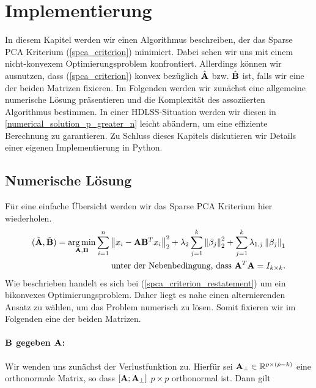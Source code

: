 \chapter{Implementierung}

\label{implementation}

In diesem Kapitel werden wir einen Algorithmus beschreiben, der das Sparse PCA Kriterium (\ref{spca_criterion}) minimiert. Dabei sehen wir uns mit einem nicht-konvexem Optimierungsproblem konfrontiert. Allerdings können wir ausnutzen, dass (\ref{spca_criterion}) konvex bezüglich $\hat{\mathbf{A}}$ bzw. $\hat{\mathbf{B}}$ ist, falls wir eine der beiden Matrizen fixieren. Im Folgenden werden wir zunächst eine allgemeine numerische Lösung präsentieren und die Komplexität des assoziierten Algorithmus bestimmen. In einer HDLSS-Situation werden wir diesen in \ref{numerical_solution_p_greater_n} leicht abändern, um eine effiziente Berechnung zu garantieren. Zu Schluss dieses Kapitels diskutieren wir Details einer eigenen Implementierung in Python.

\section{Numerische Lösung}
\label{spca_numerical_solution}

Für eine einfache Übersicht werden wir das Sparse PCA Kriterium hier wiederholen.
\begin{align}
\label{spca_criterion_restatement}
\begin{split}
(\hat{\mathbf{A}}, \hat{\mathbf{B}}) = \operatorname*{arg\,min}_{\mathbf{A}, \mathbf{B}} \sum_{i=1}^{n} \left\lVert x_i - \mathbf{A}\mathbf{B}^Tx_i \right\rVert_2^2 + \lambda_2 \sum_{j=1}^{k}\left\lVert \beta_j \right\rVert_2^2 + \sum_{j=1}^k \lambda_{1,j} \left\lVert \beta_j \right\rVert_1\\
\text{unter der Nebenbedingung, dass } \mathbf{A}^T\mathbf{A} = I_{k \times k}.
\end{split}
\end{align}
Wie beschrieben handelt es sich bei (\ref{spca_criterion_restatement}) um ein bikonvexes Optimierungsproblem. Daher liegt es nahe einen alternierenden Ansatz zu wählen, um das Problem numerisch zu lösen. Somit fixieren wir im Folgenden eine der beiden Matrizen.

\subsubsection{$\mathbf{B}$ gegeben $\mathbf{A}$:}

Wir wenden uns zunächst der Verlustfunktion zu. Hierfür sei $\mathbf{A}_{\perp} \in \mathbb{R}^{p \times (p-k)}$ eine orthonormale Matrix, so dass $[\mathbf{A} ; \mathbf{A}_{\perp}]$ $p \times p$ orthonormal ist. Dann gilt

